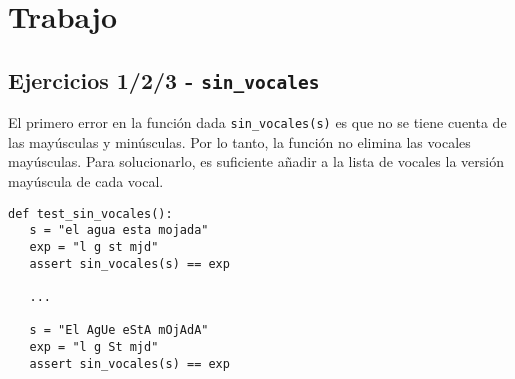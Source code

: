 \chapter{Trabajo}

\lstset{language=python}


\section{Ejercicios 1/2/3 - \texttt{sin\_vocales}}

\begin{paracol}{2}
   El primero error en la función dada \lstinline{sin_vocales(s)} es que no se tiene cuenta de las mayúsculas y minúsculas. Por lo tanto, la función no elimina las vocales mayúsculas. Para solucionarlo, es suficiente añadir a la lista de vocales la versión mayúscula de cada vocal.

   \switchcolumn

   \begin{lstlisting}
def test_sin_vocales():
   s = "el agua esta mojada"
   exp = "l g st mjd"
   assert sin_vocales(s) == exp

   ...
      
   s = "El AgUe eStA mOjAdA"
   exp = "l g St mjd"
   assert sin_vocales(s) == exp
   \end{lstlisting}
\end{paracol}

